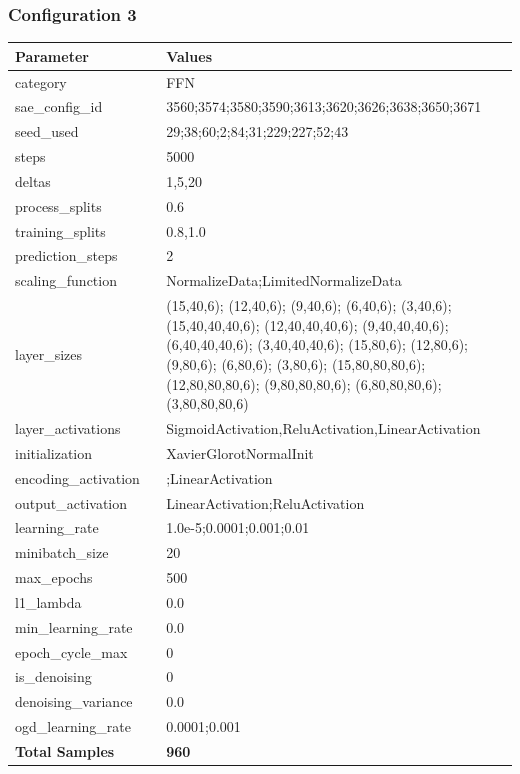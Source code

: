 \documentclass[a4paper,11pt,oneside]{article}
\theoremstyle{plain}
\theoremstyle{definition}
\begin{document}
	\subsubsection{Configuration 3}\label{config3}
	\begin{longtable}[H]{|p{0.3\linewidth}|p{0.7\linewidth}|} \hline \textbf{Parameter} &\textbf{Values} \\\hline{category} & {FFN} \\\hline
		{sae\_config\_id} & {3560;3574;3580;3590;3613;3620;3626;3638;3650;3671} \\\hline
		{seed\_used} & {29;38;60;2;84;31;229;227;52;43} \\\hline
		{steps} & {5000} \\\hline
		{deltas} & {1,5,20} \\\hline
		{process\_splits} & {0.6} \\\hline
		{training\_splits} & {0.8,1.0} \\\hline
		{prediction\_steps} & {2} \\\hline
		{scaling\_function} & {NormalizeData;LimitedNormalizeData} \\\hline
		{layer\_sizes} & {(15,40,6); (12,40,6); (9,40,6); (6,40,6); (3,40,6); (15,40,40,40,6); (12,40,40,40,6); (9,40,40,40,6); (6,40,40,40,6); (3,40,40,40,6); (15,80,6); (12,80,6); (9,80,6); (6,80,6); (3,80,6); (15,80,80,80,6); (12,80,80,80,6); (9,80,80,80,6); (6,80,80,80,6); (3,80,80,80,6)} \\\hline
		{layer\_activations} & {SigmoidActivation,ReluActivation,LinearActivation} \\\hline
		{initialization} & {XavierGlorotNormalInit} \\\hline
		{encoding\_activation} & {;LinearActivation} \\\hline
		{output\_activation} & {LinearActivation;ReluActivation} \\\hline
		{learning\_rate} & {1.0e-5;0.0001;0.001;0.01} \\\hline
		{minibatch\_size} & {20} \\\hline
		{max\_epochs} & {500} \\\hline
		{l1\_lambda} & {0.0} \\\hline
		{min\_learning\_rate} & {0.0} \\\hline
		{epoch\_cycle\_max} & {0} \\\hline
		{is\_denoising} & {0} \\\hline
		{denoising\_variance} & {0.0} \\\hline
		{ogd\_learning\_rate} & {0.0001;0.001} \\\hline
		{\textbf{Total Samples}} & {\textbf{960}} \\\hline
	\end{longtable}
	
\end{document}
